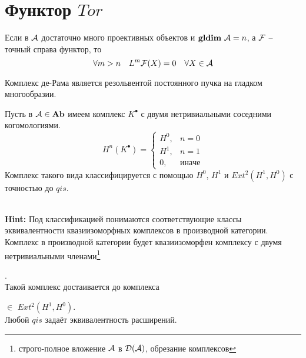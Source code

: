 \documentclass[../hw_main.tex]{subfiles}
\begin{document}
\section{Функтор $Tor$}
\begin{to_note}
Если в $\mathcal{A}$ достаточно много проективных объектов и $\mathbf{gldim}\text{ } \mathcal{A} = n$, а $\mathcal{F}$ -- точный справа функтор, то 
\[\forall m > n\quad
L^m\mathcal{F}{(X)} = 0\quad
\forall X \in \mathcal{A}\]
\end{to_note}
\begin{to_note}
Комплекс де-Рама является резольвентой постоянного пучка на гладком многообразии.
\end{to_note}
\begin{to_claim}
Пусть в $\mathcal{A}\in \mathbf{Ab}$ имеем комплекс $K^\bullet$ с двумя нетривиальными соседними когомологиями.
\[
H^n(K^\bullet) = \begin{cases} H^0, &n = 0\\ H^1, &n = 1\\ 0, &иначе\end{cases}
\]
Комплекс такого вида классифицируется с помощью $H^0$, $H^1$ и $Ext^2(H^1, H^0)$ с точностью до $qis$.
\end{to_claim}\\
\textbf{Hint:} Под классификацией понимаются соответствующие классы эквивалентности квазиизоморфных комплексов в производной категории. Комплекс в производной категории будет квазиизоморфен комплексу с двумя нетривиальными членами\footnote{строго-полное вложение $\mathcal{A}$ в $\mathcal{D(A)}$, обрезание комплексов} . \\
Такой комплекс достаивается до комплекса  $\in$ $Ext^2(H^1, H^0)$. \\
Любой $qis$ задаёт эквивалентность расширений.
\bee
{}
\eee
\bee
{}
\end{document}
